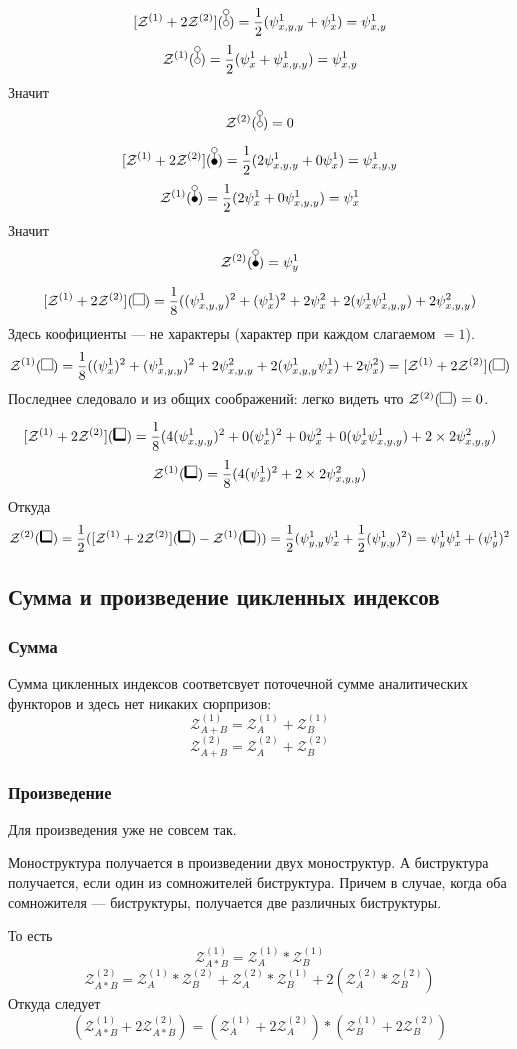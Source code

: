 \begin{example}
$$
\Zfull(\dA) = \frac{1}{2}(\psi_{x,y,y}^1 + \psi_{x}^1) = \psi_{x,y}^1
$$
$$
\Zone(\dA) = \frac{1}{2}(\psi_{x}^1 + \psi_{x, y, y}^1) = \psi_{x,y}^1
$$
Значит
$$
\Ztwo(\dA) = 0
$$
\end{example}
\begin{example}
$$
\Zfull(\dB) = \frac{1}{2}(2\psi_{x,y,y}^1 + 0\psi_{x}^1) = \psi_{x,y,y}^1
$$
$$
\Zone(\dB) = \frac{1}{2}(2\psi_{x}^1 + 0\psi_{x, y, y}^1) = \psi_{x}^1
$$
Значит
$$
\Ztwo(\dB) = \psi_{y}^1
$$
\end{example}
\begin{example}
$$
\Zfull(\dAA) = \frac{1}{8}((\psi_{x,y,y}^1)^2 + (\psi_{x}^1)^2 + 2\psi_{x}^2 +
2(\psi_x^1\psi_{x,y,y}^1) + 2\psi_{x,y,y}^2)
$$
Здесь коофициенты --- не характеры (характер при каждом слагаемом $= 1$).
$$
\Zone(\dAA) = \frac{1}{8}((\psi_{x}^1)^2 + (\psi_{x, y, y}^1)^2 +
2\psi_{x, y, y}^2 + 2(\psi_{x, y, y}^1\psi_{x}^1) + 2\psi_{x}^2) = \Zfull(\dAA)
$$
Последнее следовало и из общих соображений: легко видеть что $\mathcal
Z^{(2)}(\dAA) = 0$.
\end{example}
\begin{example}
$$
\Zfull(\dBB) = \frac{1}{8}(4(\psi_{x,y,y}^1)^2 + 0(\psi_{x}^1)^2 + 0\psi_{x}^2
+ 0(\psi_x^1\psi_{x,y,y}^1) + 2\times2\psi_{x,y,y}^2)
$$
$$
\Zone(\dBB) = \frac{1}{8}(4(\psi_{x}^1)^2 + 2\times2\psi_{x,y,y}^2)
$$
Откуда
$$
\Ztwo(\dBB) = \frac{1}{2}(\Zfull(\dBB) - \mathcal
Z^{(1)}(\dBB)) = \frac{1}{2}(\psi_{y,y}^1\psi_{x}^1 +
\frac{1}{2}(\psi_{y, y}^1)^2) = \psi_{y}^1\psi_{x}^1 + (\psi_{y}^1)^2 $$
\end{example}

\subsection{Сумма и произведение цикленных индексов}
\subsubsection{Сумма}
Сумма цикленных индексов соответсвует поточечной сумме аналитических
функторов и здесь нет никаких сюрпризов:
$$
\mathcal Z_{A + B}^{(1)} = \mathcal Z_A^{(1)} + \mathcal Z_B^{(1)}
$$
$$
\mathcal Z_{A + B}^{(2)} = \mathcal Z_A^{(2)} + \mathcal Z_B^{(2)}
$$
\subsubsection{Произведение}
Для произведения уже не совсем так. 
\begin{statement}
Моноструктура получается
в произведении двух моноструктур. А биструктура получается, если один из
сомножителей биструктура. Причем в случае, когда оба сомножителя ---
биструктуры, получается две различных биструктуры. 
\end{statement}
То есть
$$
\mathcal Z_{A * B}^{(1)} = \mathcal Z_A^{(1)} * \mathcal Z_B^{(1)}
$$
$$
\mathcal Z_{A * B}^{(2)} = 
\mathcal Z_A^{(1)} * \mathcal Z_B^{(2)} + 
\mathcal Z_A^{(2)} * \mathcal Z_B^{(1)} +
2 (\mathcal Z_A^{(2)} * \mathcal Z_B^{(2)})
$$
Откуда следует
$$
(\mathcal Z_{A * B}^{(1)} + 2\mathcal Z_{A * B}^{(2)}) = 
(\mathcal Z_A^{(1)} + 2\mathcal Z_A^{(2)}) * 
(\mathcal Z_B^{(1)} + 2\mathcal Z_B^{(2)})
$$

